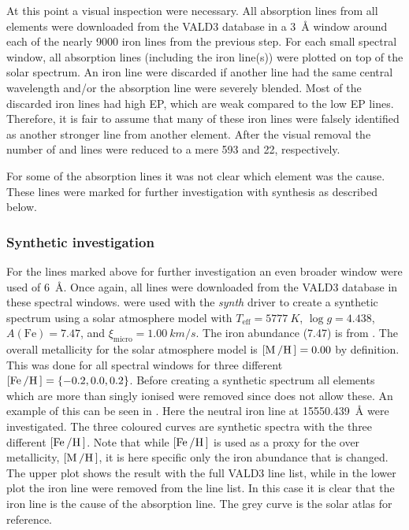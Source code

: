 At this point a visual inspection were necessary. All absorption lines from all elements were
downloaded from the VALD3 database in a \SI{3}{\angstrom} window around each of the nearly
\num{9000} iron lines from the previous step. For each small spectral window, all absorption lines
(including the iron line(s)) were plotted on top of the solar spectrum. An iron line were discarded
if another line had the same central wavelength and/or the absorption line were severely blended.
Most of the discarded iron lines had high EP, which are weak compared to the low EP lines.
Therefore, it is fair to assume that many of these iron lines were falsely identified as another
stronger line from another element. After the visual removal the number of  and
 lines were reduced to a mere 593 and 22, respectively.

For some of the absorption lines it was not clear which element was the cause. These lines were
marked for further investigation with synthesis as described below.

\subsubsection{Synthetic investigation}

For the lines marked above for further investigation an even broader window were used of
\SI{6}{\angstrom}. Once again, all lines were downloaded from the VALD3 database in these spectral
windows. \MOOG were used with the \emph{synth} driver to create a synthetic spectrum using a solar
atmosphere model with $T_\mathrm{eff}=\SI{5777}{K}$, $\log g=4.438$, $A(\mathrm{Fe})=7.47$, and
$\xi_\mathrm{micro}=\SI{1.00}{km/s}$. The iron abundance (7.47) is from \citet{Gonzalez2000}. The
overall metallicity for the solar atmosphere model is $[\ion{M}/\ion{H}]=0.00$ by definition. This
was done for all spectral windows for three different $[\ion{Fe}/\ion{H}]=\{-0.2, 0.0, 0.2\}$.
Before creating a synthetic spectrum all elements which are more than singly ionised were removed
since \MOOG does not allow these. An example of this can be seen in
. Here the neutral iron line at \SI{15550.439}{\angstrom} were
investigated. The three coloured curves are synthetic spectra with the three different
$[\ion{Fe}/\ion{H}]$. Note that while $[\ion{Fe}/\ion{H}]$ is used as a proxy for the over
metallicity, $[\ion{M}/\ion{H}]$, it is here specific only the iron abundance that is changed. The
upper plot shows the result with the full VALD3 line list, while in the lower plot the iron line
were removed from the line list. In this case it is clear that the iron line is the cause of the
absorption line. The grey curve is the solar atlas for reference.

